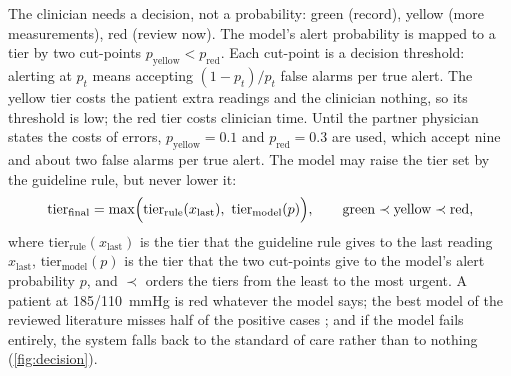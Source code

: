 The clinician needs a decision, not a probability: green (record), yellow (more measurements), red (review now). The model's alert probability is mapped to a tier by two cut-points $p_{\text{yellow}} < p_{\text{red}}$. Each cut-point is a decision threshold: alerting at $p_t$ means accepting $(1-p_t)/p_t$ false alarms per true alert. The yellow tier costs the patient extra readings and the clinician nothing, so its threshold is low; the red tier costs clinician time. Until the partner physician states the costs of errors, $p_{\text{yellow}} = 0.1$ and $p_{\text{red}} = 0.3$ are used, which accept nine and about two false alarms per true alert. The model may raise the tier set by the guideline rule, but never lower it:
\begin{equation}
  \text{tier}_{\text{final}} = \max\Bigl(\text{tier}_{\text{rule}}(x_{\text{last}}),\ \text{tier}_{\text{model}}(p)\Bigr), \qquad \text{green} \prec \text{yellow} \prec \text{red},
\end{equation}
where $\text{tier}_{\text{rule}}(x_{\text{last}})$ is the tier that the guideline rule gives to the last reading $x_{\text{last}}$, $\text{tier}_{\text{model}}(p)$ is the tier that the two cut-points give to the model's alert probability $p$, and $\prec$ orders the tiers from the least to the most urgent. A patient at 185/110~mmHg is red whatever the model says; the best model of the reviewed literature misses half of the positive cases \parencite{mendoza2025}; and if the model fails entirely, the system falls back to the standard of care rather than to nothing (\cref{fig:decision}).

